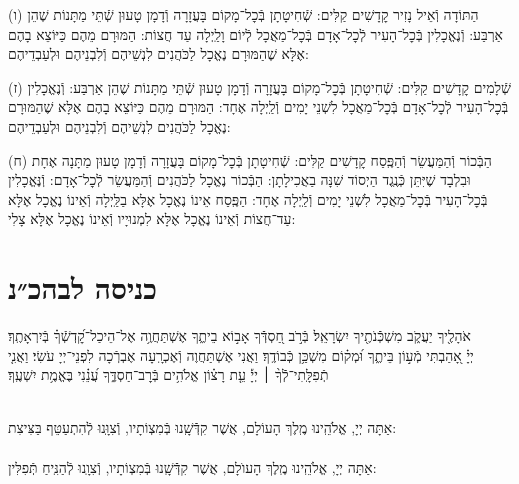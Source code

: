 \documentclass[twoside, openany, parskip=half, 11pt]{book}
\begin{document}
(ו) הַתּוֹדָה וְֿאֵיל נָזִיר קׇדָשִׁים קַלִּים: שְֿׁחִיטָתָן בְּֿכׇל־מָקוֹם בָּעֲזָרָה וְֿדָמָן טָעוּן שְֿׁתֵּי מַתָּנוֹת שֶׁהֵן אַרְבַּע: וְֿנֶאֱכָלִין בְּֿכׇל־הָעִיר לְֿכׇל־אָדָם בְּֿכׇל־מַאֲכָל לְֿיוֹם וָלַֽיְלָה עַד חֲצוֹת: הַמּוּרָם מֵהֶם כַּיּוֹצֵא בָהֶם אֶלָּא שֶׁהַמּוּרָם נֶאֱכָל לַכֹּהֲנִים לִנְשֵׁיהֶם וְֿלִבְנֵיהֶם וּלְעַבְדֵיהֶם:

(ז) שְֿׁלָמִים קׇדָשִׁים קַלִּים: שְֿׁחִיטָתָן בְּֿכׇל־מָקוֹם בָּעֲזָרָה וְֿדָמָן טָעוּן שְֿׁתֵּי מַתָּנוֹת שֶׁהֵן אַרְבַּע: וְֿנֶאֱכָלִין בְּֿכׇל־הָעִיר לְֿכׇל־אָדָם בְּֿכׇל־מַאֲכָל לִשְׁנֵי יָמִים וְֿלַֽיְלָה אֶחָד: הַמּוּרָם מֵהֶם כַּיּוֹצֵא בָהֶם אֶלָּא שֶׁהַמּוּרָם נֶאֱכָל לַכֹּהֲנִים לִנְשֵׁיהֶם וְֿלִבְנֵיהֶם וּלְעַבְדֵיהֶם:

(ח) הַבְּֿכוֹר וְֿהַמַּעֲשֵׂר וְֿהַפֶּֽסַח קׇדָשִׁים קַלִּים: שְֿׁחִיטָתָן בְּֿכׇל־מָקוֹם בָּעֲזָרָה וְֿדָמָן טָעוּן מַתָּנָה אֶחָת וּבִלְבָד שֶׁיִּתֵּן כְּֿנֶֽגֶד הַיְסוֹד שִׁנָּה בַאֲכִילָתָן: הַבְּֿכוֹר נֶאֱכָל לַכֹּהֲנִים וְֿהַמַּעֲשֵׂר לְֿכׇל־אָדָם: וְֿנֶּאֱכָלִין בְּֿכׇל־הָעִיר בְּֿכׇל־מַאֲכָל לִשְׁנֵי יָמִים וְֿלַֽיְלָה אֶחָד: הַפֶּֽסַח אֵינוֹ נֶאֱכָל אֶלָּא בַלַּֽיְלָה וְֿאֵינוֹ נֶאֱכָל אֶלָּא עַד־חֲצוֹת וְֿאֵינוֹ נֶאֱכָל אֶלָּא לִמְנוּיָיו וְֿאֵינוֹ נֶאֱכָל אֶלָּא צָלִי:\\


\section[כניסה לבהכ״נ]{ כניסה לבהכ״נ }
אֹהָלֶ֖יךָ יַעֲקֹ֑ב מִשְׁכְּֿֿנֹתֶ֖יךָ יִשְׂרָאֵֽל׃
בְּֿרֹ֣ב חַ֭סְדְּֿֿךָ אָב֣וֹא בֵיתֶ֑ךָ אֶשְׁתַּחֲוֶ֥ה אֶל־הֵיכַל־קׇ֝דְשְֿׁךָ֗ בְּֿיִרְאָתֶֽךָ׃\\
יְיָ֗ אָ֭הַבְתִּי מְֿע֣וֹן בֵּיתֶ֑ךָ וּ֝מְק֗וֹם מִשְׁכַּ֥ן כְּֿבוֹדֶֽךָ׃ 
וַאֲנִי אֶשְׁתַּחֲוֶה וְֿאֶכְרָֽעָה אֶבְרְֿכָה לִפְנֵי־יְיָ עֹשִׂי׃
וַאֲנִ֤י
%
תְֿפִלָּֽתִי־לְֿֿךָ֨ ׀ יְיָ֡ עֵ֤ת רָצ֗וֹן אֱלֹהִ֥ים בְּֿרׇב־חַסְדֶּ֑ךָ עֲ֝נֵ֗נִי בֶּאֱמֶ֥ת יִשְׁעֶֽךָ׃

\\
אַתָּה יְיָ, אֱלֹהֵֽינוּ מֶֽלֶךְ הָעוֹלָם, אֲשֶׁר קִדְּֿֿשָֽׁנוּ בְּֿמִצְוֹתָיו, וְֿצִוָּֽנוּ לְֿהִתְעַטֵּף בַּצִּיצִת:\\

\\
אַתָּה יְיָ, אֱלֹהֵֽינוּ מֶֽלֶךְ הָעוֺלָם, אֲשֶׁר קִדְּֿֿשָֽׁנוּ בְּֿמִצְוֹתָיו, וְֿצִוָֽנוּ לְֿהַנִּֽיחַ תְּֿפִלִּין:
\end{document}
